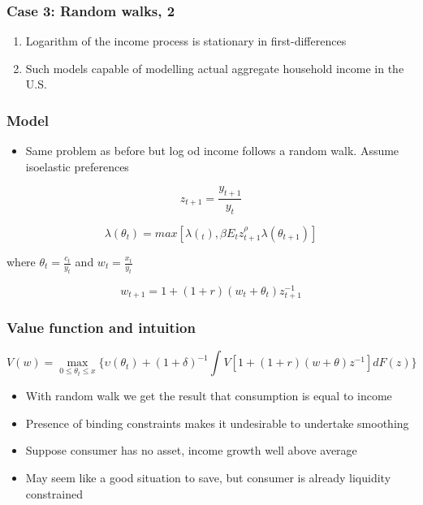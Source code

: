 \documentclass[mathserif]{beamer}
\begin{document}
\begin{frame}
\frametitle{Case 3: Random walks, 2}
\begin{enumerate}
  \item Logarithm of the income process is stationary in first-differences
  \item Such models capable of modelling actual aggregate household income in the U.S.
\end{enumerate}
\end{frame}

\begin{frame}
\frametitle{Model}

\begin{itemize}
  \item Same problem as before but log od income follows a random walk. Assume isoelastic preferences
\end{itemize}

\begin{equation*}
 z_{t+1} = \frac{y_{t+1}}{y_{t}}
\end{equation*}

\begin{equation*}
    \lambda(\theta_{t}) = max[\lambda(_{t}), \beta E_{t} z_{t+1}^{\rho} \lambda(\theta_{t+1})]
\end{equation*}

where \(\theta_{t} = \frac{c_{t}}{y_{t}}\) and \(w_{t} = \frac{x_{t}}{y_{t}}\)

\begin{equation*}
 w_{t+1}=1+(1+r)(w_{t} + \theta_{t}) z_{t+1}^{-1}
\end{equation*}
\end{frame}

\begin{frame}
\frametitle{Value function and intuition}
\begin{equation}
        V(w) = \underset{0 \leq \theta_{t} \leq x}{\max}\Bigg\{\upsilon(\theta_{t}) + (1+\delta)^{-1}\int V[1+(1+r)(w + \theta) z^{-1}] dF(z)\Bigg\}
\end{equation}

\begin{itemize}
  \item With random walk we get the result that consumption is equal to income
  \item Presence of binding constraints makes it undesirable to undertake smoothing
  \item Suppose consumer has no asset, income growth well above average
  \item May seem like a good situation to save, but consumer is already liquidity constrained
\end{itemize}
\end{frame}
\end{document}
